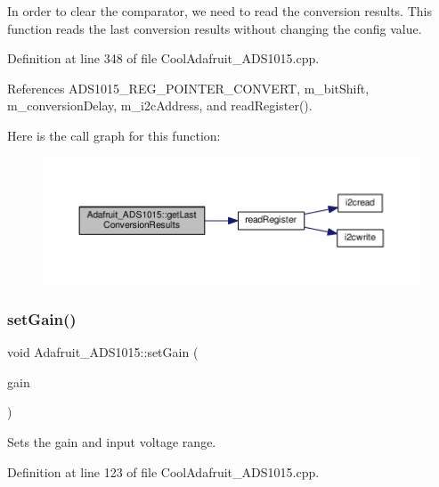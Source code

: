 In order to clear the comparator, we need to read the conversion results. This function reads the last conversion results without changing the config value. 



Definition at line 348 of file Cool\+Adafruit\+\_\+\+A\+D\+S1015.\+cpp.



References A\+D\+S1015\+\_\+\+R\+E\+G\+\_\+\+P\+O\+I\+N\+T\+E\+R\+\_\+\+C\+O\+N\+V\+E\+RT, m\+\_\+bit\+Shift, m\+\_\+conversion\+Delay, m\+\_\+i2c\+Address, and read\+Register().

Here is the call graph for this function\+:\nopagebreak
\begin{figure}[H]
\begin{center}
\leavevmode
\includegraphics[width=350pt]{df/df6/class_adafruit___a_d_s1015_ad8f36d80847020778425107f6451a8c2_cgraph}
\end{center}
\end{figure}
\mbox{\label{class_adafruit___a_d_s1015_a399441eace686975ff22937cbe45cc50}} 
\subsubsection{\texorpdfstring{set\+Gain()}{setGain()}}
{\footnotesize\ttfamily void Adafruit\+\_\+\+A\+D\+S1015\+::set\+Gain (\begin{DoxyParamCaption}\item[{\hyperlink{_cool_adafruit___a_d_s1015_8h_a3d6c0e15829a207b9155890811fa4781}{ads\+Gain\+\_\+t}}]{gain }\end{DoxyParamCaption})}



Sets the gain and input voltage range. 



Definition at line 123 of file Cool\+Adafruit\+\_\+\+A\+D\+S1015.\+cpp.



